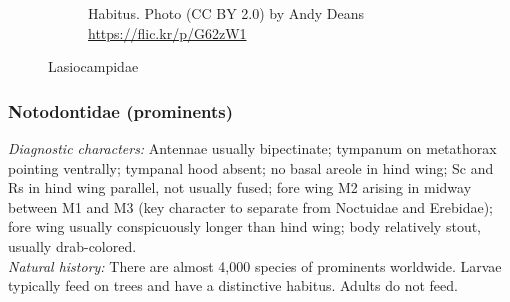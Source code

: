 \documentclass[letterpaper, 11pt]{article}
\begin{document}
\begin{figure}[ht!]
\begin{subfigure}[ht!]{0.5\textwidth}
        \caption{Habitus. Photo (CC BY 2.0) by Andy Deans \url{https://flic.kr/p/G62zW1}}
        \label{fig:lasiocampid2}
    \end{subfigure}
    \caption{Lasiocampidae}\label{fig:lasiocampids}
\end{figure}

\subsubsection{Notodontidae (prominents)}
\noindent{}\textit{Diagnostic characters:} Antennae usually bipectinate; tympanum on metathorax pointing ventrally; tympanal hood absent; no basal areole in hind wing; Sc and Rs in hind wing parallel, not usually fused; fore wing M2 arising in midway between M1 and M3 (key character to separate from Noctuidae and Erebidae); fore wing usually conspicuously longer than hind wing; body relatively stout, usually drab-colored.\\

\noindent{}\textit{Natural history:} There are almost 4,000 species of prominents worldwide. Larvae typically feed on trees and have a distinctive habitus. Adults do not feed.
\end{document}
